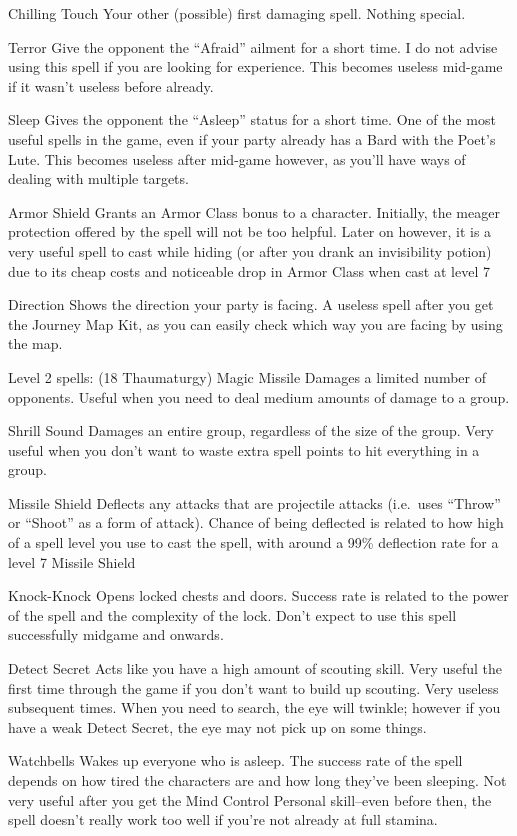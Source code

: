 \documentclass[12pt]{article}
\begin{document}
Chilling Touch Your other (possible) first damaging spell. Nothing
special.

Terror Give the opponent the ``Afraid'' ailment for a short time. I do
not advise using this spell if you are looking for experience. This
becomes useless mid-game if it wasn't useless before already.

Sleep Gives the opponent the ``Asleep'' status for a short time. One of
the most useful spells in the game, even if your party already has a
Bard with the Poet's Lute. This becomes useless after mid-game however,
as you'll have ways of dealing with multiple targets.

Armor Shield Grants an Armor Class bonus to a character. Initially, the
meager protection offered by the spell will not be too helpful. Later on
however, it is a very useful spell to cast while hiding (or after you
drank an invisibility potion) due to its cheap costs and noticeable drop
in Armor Class when cast at level 7

Direction Shows the direction your party is facing. A useless spell
after you get the Journey Map Kit, as you can easily check which way you
are facing by using the map.

Level 2 spells: (18 Thaumaturgy) Magic Missile Damages a limited number
of opponents. Useful when you need to deal medium amounts of damage to a
group.

Shrill Sound Damages an entire group, regardless of the size of the
group. Very useful when you don't want to waste extra spell points to
hit everything in a group.

Missile Shield Deflects any attacks that are projectile attacks
(i.e.~uses ``Throw'' or ``Shoot'' as a form of attack). Chance of being
deflected is related to how high of a spell level you use to cast the
spell, with around a 99\% deflection rate for a level 7 Missile Shield

Knock-Knock Opens locked chests and doors. Success rate is related to
the power of the spell and the complexity of the lock. Don't expect to
use this spell successfully midgame and onwards.

Detect Secret Acts like you have a high amount of scouting skill. Very
useful the first time through the game if you don't want to build up
scouting. Very useless subsequent times. When you need to search, the
eye will twinkle; however if you have a weak Detect Secret, the eye may
not pick up on some things.

Watchbells Wakes up everyone who is asleep. The success rate of the
spell depends on how tired the characters are and how long they've been
sleeping. Not very useful after you get the Mind Control Personal
skill--even before then, the spell doesn't really work too well if
you're not already at full stamina.
\end{document}
